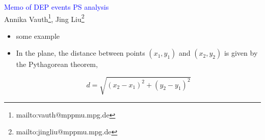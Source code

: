 \documentclass[landscape]{slides}
\begin{document}
\begin{slide}
\begin{center}
\textcolor{blue}{Memo of DEP events PS analysis}\\
Annika Vauth\footnote{mailto:vauth@mppmu.mpg.de},
Jing Liu\footnote{mailto:jingliu@mppmu.mpg.de}
\end{center}

\begin{itemize}

\item some example

\item In the plane, the distance between points $(x_1, y_1)$ and $(x_2, y_2)$ is given by the Pythagorean theorem,

$$d=\sqrt{(x_2-x_1)^2+(y_2-y_1)^2}$$

\end{itemize}

\end{slide}
\end{document}
